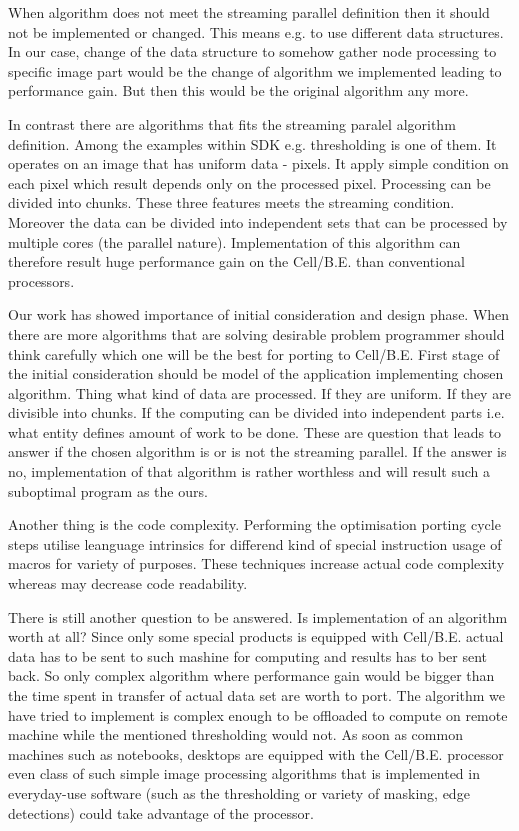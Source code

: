 \par
When algorithm does not meet the streaming parallel definition then it should not be implemented or changed.
This means e.g. to use different data structures.
In our case, change of the data structure to somehow gather node processing to specific image part would be the change of algorithm we implemented leading to performance gain.
But then this would be the original algorithm any more.

\par
In contrast there are algorithms that fits the streaming paralel algorithm definition.
Among the examples within SDK e.g. thresholding is one of them.
It operates on an image that has uniform data - pixels.
It apply simple condition on each pixel which result depends only on the processed pixel.
Processing can be divided into chunks.
These three features meets the streaming condition.
Moreover the data can be divided into independent sets that can be processed by multiple cores (the parallel nature).
Implementation of this algorithm can therefore result huge performance gain on the Cell/B.E. than conventional processors.

\par
Our work has showed importance of initial consideration and design phase.
When there are more algorithms that are solving desirable problem programmer should think carefully which one will be the best for porting to Cell/B.E.
First stage of the initial consideration should be model of the application implementing chosen algorithm.
Thing what kind of data are processed.
If they are uniform.
If they are divisible into chunks.
If the computing can be divided into independent parts i.e. what entity defines amount of work to be done.
These are question that leads to answer if the chosen algorithm is or is not the streaming parallel.
If the answer is no, implementation of that algorithm is rather worthless and will result such a suboptimal program as the ours.

\par
Another thing is the code complexity.
Performing the optimisation porting cycle steps utilise leanguage intrinsics for differend kind of special instruction usage of macros for variety of purposes.
These techniques increase actual code complexity whereas may decrease code readability.

\par
There is still another question to be answered.
Is implementation of an algorithm worth at all?
Since only some special products is equipped with Cell/B.E. actual data has to be sent to such mashine for computing and results has to ber sent back.
So only complex algorithm where performance gain would be bigger than the time spent in transfer of actual data set are worth to port.
The algorithm we have tried to implement is complex enough to be offloaded to compute on remote machine while the mentioned thresholding would not.
As soon as common machines such as notebooks, desktops are equipped with the Cell/B.E. processor even class of such simple image processing algorithms that is implemented in everyday-use software (such as the thresholding or variety of masking, edge detections) could take advantage of the processor.

